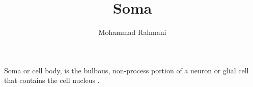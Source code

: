 \documentclass[a4paper]{article}
\title{Soma}
\date{}
\author{Mohammad Rahmani}
\begin{document}
    \maketitle
    Soma or cell body, is the bulbous, non-process portion of a neuron or glial cell that contains the cell nucleus .
    
    
\end{document}
